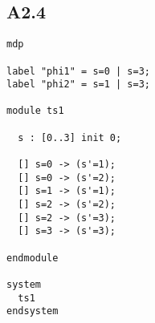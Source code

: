 \subsection{A2.4}

\begin{verbatim}
mdp

label "phi1" = s=0 | s=3;
label "phi2" = s=1 | s=3;

module ts1
  
  s : [0..3] init 0;

  [] s=0 -> (s'=1);
  [] s=0 -> (s'=2);
  [] s=1 -> (s'=1);
  [] s=2 -> (s'=2);
  [] s=2 -> (s'=3);
  [] s=3 -> (s'=3);

endmodule

system
  ts1
endsystem
\end{verbatim}

